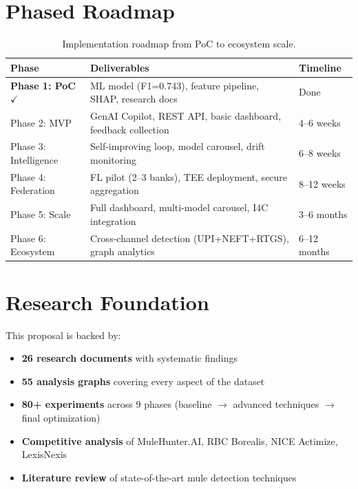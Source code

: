 \documentclass[11pt, a4paper]{article}
\begin{document}
\section{Phased Roadmap}

\begin{table}[H]
\centering
\small
{}
\begin{tabularx}{\textwidth}{L{3.5cm} Y L{2.5cm}}
\toprule
{}
\textbf{Phase} & \textbf{Deliverables} & \textbf{Timeline} \\
\midrule
\textbf{Phase 1: PoC} \textcolor{highlightgreen}{$\checkmark$} & ML model (F1=0.743), feature pipeline, SHAP, research docs & Done \\
Phase 2: MVP & GenAI Copilot, REST API, basic dashboard, feedback collection & 4--6 weeks \\
Phase 3: Intelligence & Self-improving loop, model carousel, drift monitoring & 6--8 weeks \\
Phase 4: Federation & FL pilot (2--3 banks), TEE deployment, secure aggregation & 8--12 weeks \\
Phase 5: Scale & Full dashboard, multi-model carousel, I4C integration & 3--6 months \\
Phase 6: Ecosystem & Cross-channel detection (UPI+NEFT+RTGS), graph analytics & 6--12 months \\
\bottomrule
\end{tabularx}
\caption{Implementation roadmap from PoC to ecosystem scale.}
\end{table}


\section{Research Foundation}

This proposal is backed by:
\begin{itemize}
    \item \textbf{26 research documents} with systematic findings
    \item \textbf{55 analysis graphs} covering every aspect of the dataset
    \item \textbf{80+ experiments} across 9 phases (baseline $\rightarrow$ advanced techniques $\rightarrow$ final optimization)
    \item \textbf{Competitive analysis} of MuleHunter.AI, RBC Borealis, NICE Actimize, LexisNexis
    \item \textbf{Literature review} of state-of-the-art mule detection techniques
\end{itemize}
\end{document}
